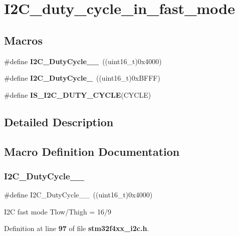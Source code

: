 \section{I2\+C\+\_\+duty\+\_\+cycle\+\_\+in\+\_\+fast\+\_\+mode}
\label{group__I2C__duty__cycle__in__fast__mode}
\subsection*{Macros}
\begin{DoxyCompactItemize}
\item 
\#define \textbf{ I2\+C\+\_\+\+Duty\+Cycle\+\_\+\_}~((uint16\+\_\+t)0x4000)
\item 
\#define \textbf{ I2\+C\+\_\+\+Duty\+Cycle\+\_}~((uint16\+\_\+t)0x\+B\+F\+F\+F)
\item 
\#define \textbf{ I\+S\+\_\+\+I2\+C\+\_\+\+D\+U\+T\+Y\+\_\+\+C\+Y\+C\+LE}(C\+Y\+C\+LE)
\end{DoxyCompactItemize}


\subsection{Detailed Description}


\subsection{Macro Definition Documentation}
\mbox{\label{group__I2C__duty__cycle__in__fast__mode_ga2b4ff186808a8095fc2d1b8193f30ce1}} 
\subsubsection{I2\+C\+\_\+\+Duty\+Cycle\+\_\+\_}
{\footnotesize\ttfamily \#define I2\+C\+\_\+\+Duty\+Cycle\+\_\+\_~((uint16\+\_\+t)0x4000)}

I2C fast mode Tlow/\+Thigh = 16/9 

Definition at line \textbf{ 97} of file \textbf{ stm32f4xx\+\_\+i2c.\+h}.

